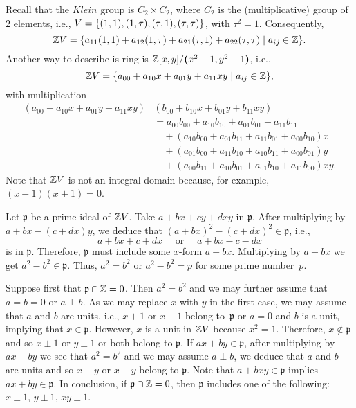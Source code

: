 \begin{solution}
    Recall that the $Klein$ group is $C_2\times C_2$, where $C_2$ is the (multiplicative) group of $2$ elements, i.e., $V=\{(1,1), (1,\tau), (\tau,1), (\tau,\tau)\}$, with $\tau^2=1$. Consequently,
    $$
        \mathbb{Z} V = \{a_{11}(1,1) + a_{12}(1,\tau)
            + a_{21}(\tau,1) + a_{22}(\tau,\tau)
            \mid a_{ij}\in\mathbb{Z}\}.
    $$
    Another way to describe is ring is $\mathbb{Z}[x,y]/\textrm{\boldmath$($}x^2-1,y^2-1\textrm{\boldmath$)$}$, i.e.,
    $$
        \mathbb{Z} V = \{a_{00} + a_{10}x + a_{01}y + a_{11}xy
            \mid a_{ij}\in\mathbb{Z}\},
    $$
    with multiplication
    \begin{align*}
        (a_{00} + a_{10}x + a_{01}y + a_{11}xy)&
            (b_{00} + b_{10}x + b_{01}y + b_{11}xy)\\
            &= a_{00}b_{00}+a_{10}b_{10}+a_{01}b_{01}+a_{11}b_{11}\\
            &\quad+ (a_{10}b_{00}+a_{01}b_{11}+a_{11}b_{01}+a_{00}b_{10})x\\
            &\quad+ (a_{01}b_{00}+a_{11}b_{10}+a_{10}b_{11}+a_{00}b_{01})y\\
            &\quad+ (a_{00}b_{11}+a_{10}b_{01}+a_{01}b_{10}+a_{11}b_{00})xy.
    \end{align*}
    Note that $\mathbb{Z} V$ is not an integral domain because, for example, $(x-1)(x+1)=0$.
    
    Let $\mathfrak p$ be a prime ideal of $\mathbb{Z} V$. Take $a + bx + cy + dxy$ in $\mathfrak p$. After multiplying by $a + bx - (c + dx)y$, we deduce that $(a+bx)^2-(c+dx)^2\in\mathfrak p$, i.e.,
    $$
        a+bx+c+dx\quad \text{ or }\quad a+bx-c-dx
    $$
    is in $\mathfrak p$. Therefore, $\mathfrak p$ must include some $x$-form $a+bx$. Multiplying by $a-bx$ we get $a^2-b^2\in\mathfrak p$. Thus, $a^2=b^2$ or $a^2-b^2=p$ for some prime number~$p$.

    Suppose first that $\mathfrak p\cap\mathbb{Z}=0$. Then $a^2=b^2$ and we may further assume that $a=b=0$ or $a\perp b$. As we may replace $x$ with $y$ in the first case, we may assume that $a$ and $b$ are units, i.e., $x+1$ or $x-1$ belong to~$\mathfrak p$ or $a=0$ and $b$ is a unit, implying that $x\in\mathfrak p$. However, $x$ is a unit in $\mathbb{Z} V$ because $x^2=1$. Therefore, $x\notin\mathfrak p$ and so $x\pm1$ or $y\pm1$ or both belong to $\mathfrak p$. If $ax+by\in\mathfrak p$, after multiplying by $ax-by$ we see that $a^2=b^2$ and we may assume $a\perp b$, we deduce that $a$ and $b$ are units and so $x+y$ or $x-y$ belong to $\mathfrak p$. Note that $a+bxy\in\mathfrak p$ implies $ax+by\in\mathfrak p$. In conclusion, if $\mathfrak p\cap\mathbb{Z}=0$, then $\mathfrak p$ includes one of the following: $x\pm1$, $y\pm1$, $xy\pm 1$.


\end{solution}
